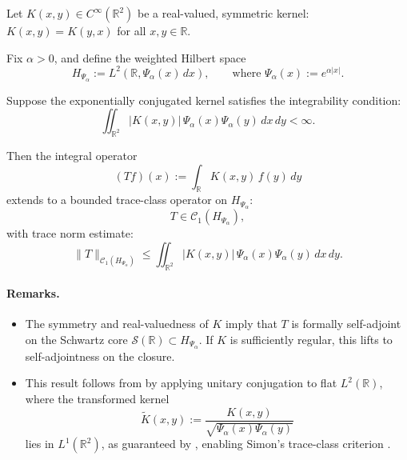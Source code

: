 \begin{lemma}
\label{lem:trace_class_conjugated_kernel}
Let \( K(x, y) \in C^\infty(\mathbb{R}^2) \) be a real-valued, symmetric kernel: \( K(x,y) = K(y,x) \) for all \( x,y \in \mathbb{R} \).

Fix \( \alpha > 0 \), and define the weighted Hilbert space
\[
H_{\Psi_\alpha} := L^2(\mathbb{R}, \Psi_\alpha(x)\, dx), \qquad \text{where } \Psi_\alpha(x) := e^{\alpha |x|}.
\]

Suppose the exponentially conjugated kernel satisfies the integrability condition:
\[
\iint_{\mathbb{R}^2} |K(x, y)| \, \Psi_\alpha(x) \Psi_\alpha(y) \, dx\, dy < \infty.
\]

Then the integral operator
\[
(T f)(x) := \int_{\mathbb{R}} K(x, y)\, f(y)\, dy
\]
extends to a bounded trace-class operator on \( H_{\Psi_\alpha} \):
\[
T \in \mathcal{C}_1(H_{\Psi_\alpha}),
\]
with trace norm estimate:
\[
\| T \|_{\mathcal{C}_1(H_{\Psi_\alpha})}
\le \iint_{\mathbb{R}^2} |K(x, y)|\, \Psi_\alpha(x)\Psi_\alpha(y)\, dx\, dy.
\]

\paragraph{Remarks.}
\begin{itemize}
    \item The symmetry and real-valuedness of \( K \) imply that \( T \) is formally self-adjoint on the Schwartz core \( \mathcal{S}(\mathbb{R}) \subset H_{\Psi_\alpha} \). If \( K \) is sufficiently regular, this lifts to self-adjointness on the closure.

    \item This result follows from  by applying unitary conjugation to flat \( L^2(\mathbb{R}) \), where the transformed kernel
    \[
    \widetilde{K}(x,y) := \frac{K(x,y)}{\sqrt{\Psi_\alpha(x)\Psi_\alpha(y)}}
    \]
    lies in \( L^1(\mathbb{R}^2) \), as guaranteed by , enabling Simon's trace-class criterion \cite[Thm.~4.2]{Simon2005TraceIdeals}.
\end{itemize}
\end{lemma}
